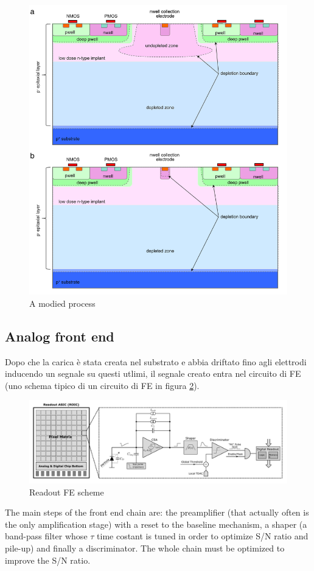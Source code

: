 \begin{titlepage}
\begin{figure}
   \includegraphics[width=.7\linewidth]{figures/modified_process.png}
   \caption{A modied process}
   \label{fig:modified_process}
\end{figure}


\subsection{Analog front end}
Dopo che la carica è stata creata nel substrato e abbia driftato fino agli elettrodi
inducendo un segnale su questi utlimi, il segnale creato entra nel circuito di FE 
(uno schema tipico di un circuito di FE in figura \ref{fig:readout_scheme}).
\begin{figure}
   \centering
   \includegraphics[width=1.\linewidth]{figures/readout_scheme.png}
   \caption{Readout FE scheme}
   \label{fig:readout_scheme}
\end{figure}
The main steps of the front end chain are: the preamplifier (that actually often is the 
only amplification stage) with a reset to the baseline mechanism, a shaper (a band-pass 
filter whose $\tau$ time costant is tuned in order to optimize S/N ratio and pile-up)
and finally a discriminator. The whole chain must be optimized to improve the S/N ratio.\\


\end{titlepage}
